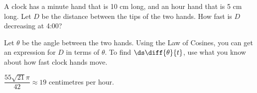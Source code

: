 %

\begin{question}\label{s3.2triangleslast}
A clock has a minute hand that is 10 cm long, and an hour hand that is 5 cm long.
Let $D$ be the distance between the tips of the two hands. How fast is $D$ decreasing at 4:00?
\begin{center}\end{center}
\end{question}
\begin{hint}
Let $\theta$ be the angle between the two hands. Using the Law of Cosines, you can get an expression for $D$ in terms of $\theta$.  To find $\ds\diff{\theta}{t}$, use what you know about how fast clock hands move.
\end{hint}
\begin{answer}
$\dfrac{55\sqrt{21}\pi}{42}\approx 19$ centimetres per hour.
\end{answer}
